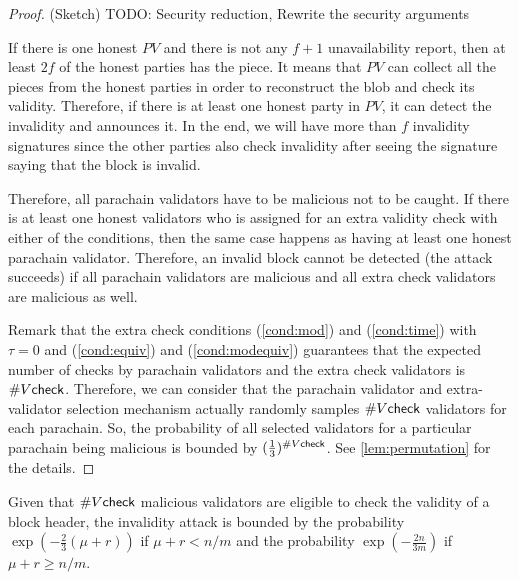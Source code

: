 \begin{proof}(Sketch)
TODO: Security reduction, Rewrite the security arguments


If there is one honest $PV$ and there is not any $f+1$ unavailability report, then at least $2f$ of the honest parties has the piece. It means that $PV$ can collect all the pieces from the honest parties in order to reconstruct the blob and check its validity. Therefore, if there is at least one honest party in $PV$, it can detect the invalidity and announces it. In the end, we will have more than $f$ invalidity signatures since the other parties also check invalidity after seeing the signature saying that the block is invalid.

Therefore, all parachain validators have to be malicious not to be caught. 
If there is at least one honest validators who is assigned for an extra validity check with either of the conditions, then the same case happens as having at least one honest parachain validator. Therefore, an invalid block cannot be detected (the attack succeeds) if all parachain validators are malicious and all extra check validators are malicious as well. 

Remark that the extra check conditions (\ref{cond:mod}) and (\ref{cond:time})  with $\tau = 0$ and (\ref{cond:equiv}) and (\ref{cond:modequiv}) guarantees that the expected number of checks by parachain validators and the extra check validators is $\#V\mathsf{check}$. %
Therefore, we can consider that the parachain validator and extra-validator selection mechanism actually randomly samples $\#V\mathsf{check}$ validators for each parachain. So, the probability of all selected validators for a particular parachain being malicious is bounded by $(\frac{1}{3})^{\#V\mathsf{check}}$. See \ref{lem:permutation} for the details.

\end{proof}



\begin{theorem}\label{thm:vcheckmal}
Given that $\#V\mathsf{check}$ malicious validators are eligible to check the validity of a block header, the invalidity attack is bounded by the probability  $\exp(-\frac{2}{3}(\mu+r))$ if $\mu + r < n/m$ and the probability $\exp(-\frac{2n}{3m})$ if $\mu + r \geq n/m$.
\end{theorem}


